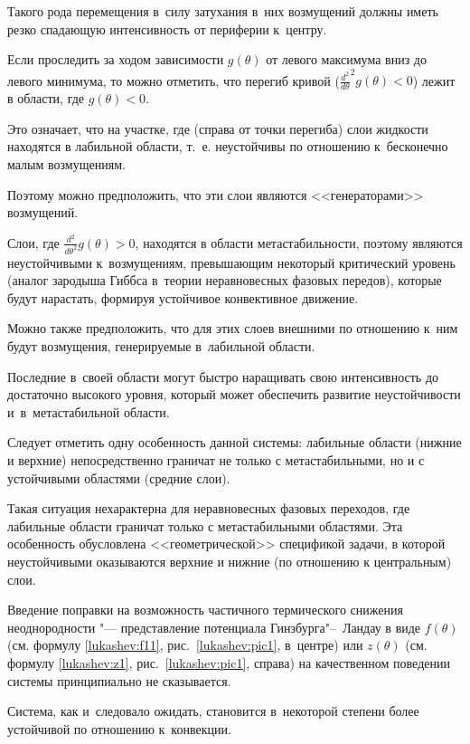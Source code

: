 Такого рода перемещения в~силу затухания в~них возмущений должны иметь резко спадающую интенсивность от периферии к~центру.



Если проследить за ходом зависимости $g(\theta)$ от левого максимума вниз до левого минимума, то можно отметить, что перегиб кривой ($\frac{d^2}{d\theta}^2g(\theta)<0$) лежит в области, где $g(\theta)<0$. 

Это означает, что на участке, где  (справа от точки перегиба) слои жидкости находятся в лабильной области, т.~е. неустойчивы по отношению к~бесконечно малым возмущениям. 

Поэтому можно предположить, что эти слои являются <<генераторами>> возмущений. 

Слои, где $\frac{d^2}{d\theta^2}g(\theta)>0$, находятся в области метастабильности, поэтому являются неустойчивыми к~возмущениям, превышающим некоторый критический уровень (аналог зародыша Гиббса в~теории неравновесных фазовых передов), которые будут нарастать, формируя устойчивое конвективное движение. 

Можно также предположить, что для этих слоев внешними по отношению к~ним будут возмущения, генерируемые в~лабильной области. 

Последние в~своей области могут быстро наращивать свою интенсивность до достаточно высокого уровня, который может обеспечить развитие неустойчивости и~в~метастабильной области.



Следует отметить одну особенность данной системы: лабильные области (нижние и верхние) непосредственно граничат не только с метастабильными, но и с устойчивыми областями (средние слои). 

Такая ситуация нехарактерна для неравновесных фазовых переходов, где лабильные области граничат только с метастабильными областями. Эта особенность обусловлена <<геометрической>> спецификой задачи, в которой неустойчивыми оказываются верхние и нижние (по отношению к центральным) слои.



Введение поправки на возможность частичного термического снижения неоднородности "--- представление потенциала Гинзбурга"--~Ландау в виде $f(\theta)$ (см. формулу \eqref{lukashev:f11},  рис.~\ref{lukashev:pic1}, в~центре) или  $z(\theta)$ (см. формулу \eqref{lukashev:z1}, рис.~\ref{lukashev:pic1}, справа) на качественном поведении системы принципиально не сказывается. 

Система, как и~следовало ожидать, становится в~некоторой степени более устойчивой по отношению к~конвекции.



